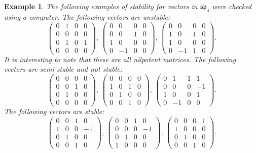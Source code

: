 \documentclass[12pt]{amsart}
\theoremstyle{plain}
\newtheorem{example}[theorem]{Example}
\begin{document}
\begin{example}
The following examples of stability for vectors in $\mathfrak{sp}_4$ were checked using a computer.
The following vectors are unstable:
$$
\begin{pmatrix} 
	0 & 1 & 0 & 0 \\ 
	0 & 0 & 0 & 0 \\
	0 & 1 & 0 & 1 \\
	0 & 0 & 0 & 0
\end{pmatrix}, \, 
\begin{pmatrix} 
	0 & 0 & 0 & 0 \\ 
	0 & 0 & 1 & 0 \\
	1 & 0 & 0 & 0 \\
	0 & -1 & 0 & 0
\end{pmatrix}, \, 
\begin{pmatrix} 
	0 & 0 & 0 & 0 \\ 
	1 & 0 & 1 & 0 \\
	1 & 0 & 0 & 0 \\
	0 & -1 & 1 & 0
\end{pmatrix}.
$$
It is interesting to note that these are all nilpotent matrices.
The following vectors are semi-stable and not stable:
$$
\begin{pmatrix} 
	0 & 0 & 0 & 0 \\ 
	0 & 0 & 1 & 0 \\
	0 & 1 & 0 & 0 \\
	0 & 0 & 0 & 0
\end{pmatrix}, \, 
\begin{pmatrix} 
	0 & 0 & 0 & 0 \\ 
	1 & 0 & 1 & 0 \\
	0 & 1 & 0 & 0 \\
	0 & 0 & 1 & 0
\end{pmatrix}, \, 
\begin{pmatrix} 
	0 & 1 & 1 & 1 \\ 
	0 & 0 & 0 & -1 \\
	1 & 0 & 0 & 1 \\
	0 & -1 & 0 & 0
\end{pmatrix}.
$$
The following vectors are stable:
$$
\begin{pmatrix} 
	0 & 0 & 1 & 0 \\ 
	1 & 0 & 0 & -1 \\
	0 & 1 & 0 & 0 \\
	0 & 0 & 1 & 0
\end{pmatrix}, \,
\begin{pmatrix} 
	0 & 0 & 1 & 0 \\ 
	0 & 0 & 0 & -1 \\
	0 & 1 & 0 & 0 \\
	1 & 0 & 0 & 0
\end{pmatrix}, \, 
\begin{pmatrix} 
	0 & 0 & 0 & 1 \\ 
	1 & 0 & 0 & 0 \\
	0 & 1 & 0 & 0 \\
	0 & 0 & 1 & 0
\end{pmatrix}.
$$ 
\end{example}
\end{document}
